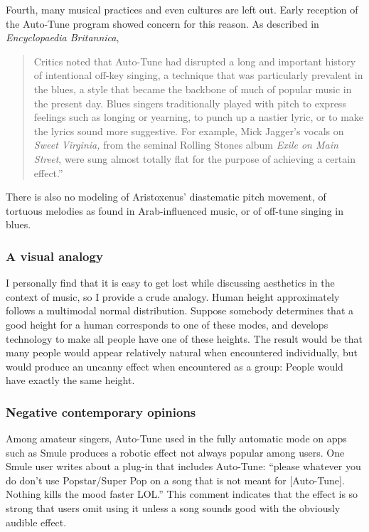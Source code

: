 Fourth, many musical practices and even cultures are left out. Early reception of the Auto-Tune program showed concern for this reason. As described in \textit{Encyclopaedia Britannica}, 
\begin{quotation}Critics noted that Auto-Tune had disrupted a long and important history of intentional off-key singing, a technique that was particularly prevalent in the blues, a style that became the backbone of much of popular music in the present day. Blues singers traditionally played with pitch to express feelings such as longing or yearning, to punch up a nastier lyric, or to make the lyrics sound more suggestive. For example, Mick Jagger’s vocals on \textit{Sweet Virginia,} from the seminal Rolling Stones album \textit{Exile on Main Street}, were sung almost totally flat for the purpose of achieving a certain effect.'' \cite{autotuneBritannica}
\end{quotation} 
There is also no modeling of Aristoxenus' diastematic pitch movement, of tortuous melodies as found in Arab-influenced music, or of off-tune singing in blues.

\subsubsection{A visual analogy}
I personally find that it is easy to get lost while discussing aesthetics in the context of music, so I provide a crude analogy. Human height approximately follows a multimodal normal distribution. Suppose somebody determines that a good height for a human corresponds to one of these modes, and develops technology to make all people have one of these heights. The result would be that many people would appear relatively natural when encountered individually, but would produce an uncanny effect when encountered as a group: People would have exactly the same height. 

\subsubsection{Negative contemporary opinions}
Among amateur singers, Auto-Tune used in the fully automatic mode on apps such as Smule produces a robotic effect not always popular among users. One Smule user writes about a plug-in that includes Auto-Tune: ``please whatever you do don’t use Popstar/Super Pop on a song that is not meant for [Auto-Tune]. Nothing kills the mood faster LOL.'' \cite{smule-blog} This comment indicates that the effect is so strong that users omit using it unless a song sounds good with the obviously audible effect. 

